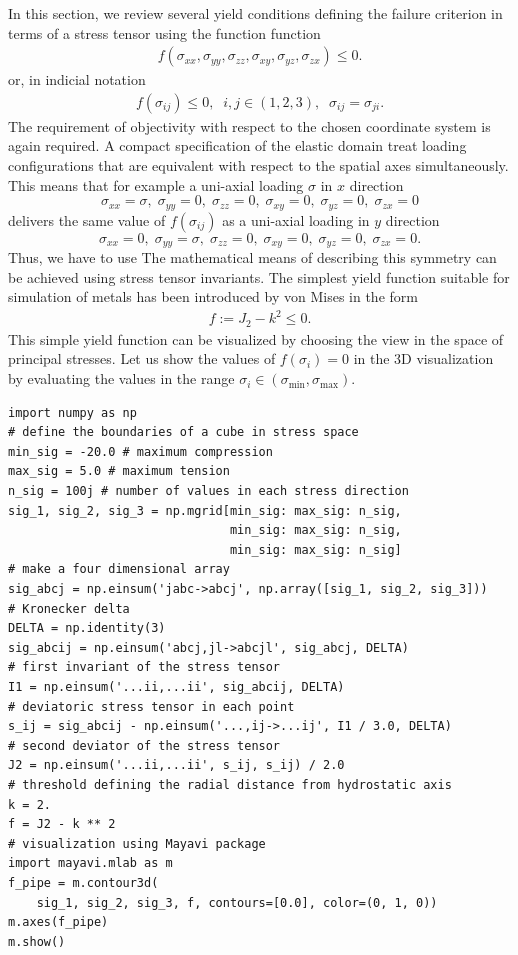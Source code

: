 \documentclass[main.tex]{subfiles}
\begin{document}
In this section, we review several yield conditions defining the failure criterion 
in terms of a stress tensor using the function function 
\begin{align}
\label{EQ:3d_yield_face}
f( \sigma_{xx}, \sigma_{yy}, \sigma_{zz},
 \sigma_{xy}, \sigma_{yz}, \sigma_{zx} ) 
 \leq  0.
\end{align}
or, in indicial notation
\begin{align}
f( \sigma_{ij} ) \leq 0, \;\; i,j \in (1,2,3), \;\; \sigma_{ij} = \sigma_{ji}.
\end{align}
The requirement of objectivity with respect to the chosen coordinate system is again required. 
A compact specification of the elastic domain treat loading configurations that are equivalent with respect to the spatial axes simultaneously. This means that for example a uni-axial loading $\sigma$ in $x$ direction
\[
\sigma_{xx} = \sigma, \; \sigma_{yy} = 0, \; \sigma_{zz} = 0, \;
\sigma_{xy} = 0, \; \sigma_{yz} = 0, \; \sigma_{zx} = 0
\]
delivers the same value of $f(\sigma_{ij})$ as a uni-axial loading in $y$ direction
\[
\sigma_{xx} = 0, \; \sigma_{yy} = \sigma, \; \sigma_{zz} = 0, \;
\sigma_{xy} = 0, \; \sigma_{yz} = 0, \; \sigma_{zx} = 0.
\]
Thus, we have to use The mathematical means of describing this symmetry can be achieved using stress tensor invariants. The simplest yield function suitable for simulation of metals has been introduced by von Mises
in the form
\begin{align}
    \label{EQ:J2_plasticity}
    f := J_2 - k^2 \leq 0.
\end{align}
This simple yield function can be visualized by choosing the view in the space of principal stresses. 
Let us show the values of $f(\sigma_i) = 0$ in the 3D visualization by evaluating the values 
in the range $\sigma_i \in (\sigma_{\min}, \sigma_{\max})$.
\begin{lstlisting}
import numpy as np
# define the boundaries of a cube in stress space
min_sig = -20.0 # maximum compression
max_sig = 5.0 # maximum tension
n_sig = 100j # number of values in each stress direction
sig_1, sig_2, sig_3 = np.mgrid[min_sig: max_sig: n_sig,
                               min_sig: max_sig: n_sig,
                               min_sig: max_sig: n_sig]
# make a four dimensional array 
sig_abcj = np.einsum('jabc->abcj', np.array([sig_1, sig_2, sig_3]))
# Kronecker delta
DELTA = np.identity(3)
sig_abcij = np.einsum('abcj,jl->abcjl', sig_abcj, DELTA)
# first invariant of the stress tensor
I1 = np.einsum('...ii,...ii', sig_abcij, DELTA)
# deviatoric stress tensor in each point
s_ij = sig_abcij - np.einsum('...,ij->...ij', I1 / 3.0, DELTA)
# second deviator of the stress tensor
J2 = np.einsum('...ii,...ii', s_ij, s_ij) / 2.0
# threshold defining the radial distance from hydrostatic axis
k = 2.
f = J2 - k ** 2
# visualization using Mayavi package
import mayavi.mlab as m
f_pipe = m.contour3d(
    sig_1, sig_2, sig_3, f, contours=[0.0], color=(0, 1, 0))
m.axes(f_pipe)
m.show()
\end{lstlisting}
\end{document}
